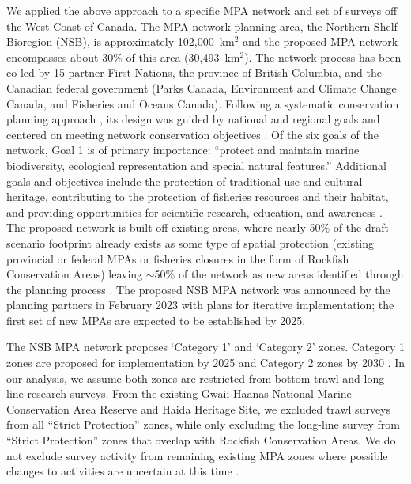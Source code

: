 \documentclass[12pt]{article}
\begin{document}
We applied the above approach to a specific MPA network and set of surveys off the West Coast of Canada.
The MPA network planning area, the Northern Shelf Bioregion (NSB), is approximately 102,000~km$^2$ and the proposed MPA network encompasses about 30\% of this area (30,493~km$^2$).
The network process has been co-led by 15 partner First Nations, the province of British Columbia, and the Canadian federal government (Parks Canada, Environment and Climate Change Canada, and Fisheries and Oceans Canada). 
Following a systematic conservation planning approach \citep{margules2000}, its design was guided by national and regional goals \citep{canada2011, canada2014} and centered on meeting network conservation objectives \citep{dfo2022networkactionplan}.
Of the six goals of the network, Goal 1 is of primary importance: ``protect and maintain marine biodiversity, ecological representation and special natural features.''
Additional goals and objectives include the protection of traditional use and cultural heritage, contributing to the protection of fisheries resources and their habitat, and providing opportunities for scientific research, education, and awareness \citep{canada2014}.
The proposed network is built off existing areas, where nearly 50\% of the draft scenario footprint already exists as some type of spatial protection (existing provincial or federal MPAs or fisheries closures in the form of Rockfish Conservation Areas) leaving $\sim$50\% of the network as new areas identified through the planning process \citep{dfo2022networkactionplan}.
The proposed NSB MPA network was announced by the planning partners in February 2023 with plans for iterative implementation; the first set of new MPAs are expected to be established by 2025.

The NSB MPA network proposes `Category 1' and `Category 2' zones.
Category 1 zones are proposed for implementation by 2025 and Category 2 zones by 2030 \citep{dfo2022networkactionplan}. 
In our analysis, we assume both zones are restricted from bottom trawl and long-line research surveys. 
From the existing Gwaii Haanas National Marine Conservation Area Reserve and Haida Heritage Site, we excluded trawl surveys from all ``Strict Protection'' zones, while only excluding the long-line survey from ``Strict Protection'' zones that overlap with Rockfish Conservation Areas. We do not exclude survey activity from remaining existing MPA zones where possible changes to activities are uncertain at this time \citep{dfo2022networkactionplan}.
\end{document}
